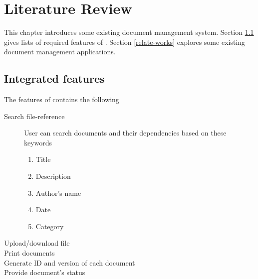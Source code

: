 \chapter{Literature Review}
This chapter introduces some existing document management system.
Section \ref{dms-features} gives lists of required features of \dms.
Section \ref{relate-works} explores some existing document management applications.

\section{Integrated features} \label{dms-features}
The features of \dms contains the following
\begin{description}
\item[Search file-reference]
User can search documents and their dependencies based on these keywords
\begin{enumerate}
\item Title
\item Description
\item Author's name
\item Date
\item Category
\end{enumerate}

\item[Upload/download file]
\item[Print documents]
\item[Generate ID and version of each document]
\item[Provide document's status]
\end{description}

